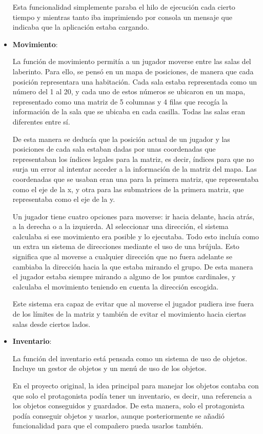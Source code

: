 \begin{itemize}
	Esta funcionalidad simplemente paraba el hilo de ejecución cada cierto tiempo y mientras tanto iba imprimiendo por consola un mensaje que indicaba que la aplicación estaba cargando.
	
	\item \textbf{Movimiento}:
	
	La función de movimiento permitía a un jugador moverse entre las salas del laberinto. Para ello, se pensó en un mapa de posiciones, de manera que cada posición representara una habitación.
	Cada sala estaba representada como un número del 1 al 20, y cada uno de estos números se ubicaron en un mapa, representado como una matriz de 5 columnas y 4 filas que recogía la información de la sala que se ubicaba en cada casilla. Todas las salas eran diferentes entre sí.
	
	De esta manera se deducía que la posición actual de un jugador y las posiciones de cada sala estaban dadas por unas coordenadas que representaban los índices legales para la matriz, es decir, índices para que no surja un error al intentar acceder a la información de la matriz del mapa. Las coordenadas que se usaban eran una para la primera matriz, que representaba como el eje de la x, y otra para las submatrices de la primera matriz, que representaba como el eje de la y.
	
	Un jugador tiene cuatro opciones para moverse: ir hacia delante, hacia atrás, a la derecha o a la izquierda. Al seleccionar una dirección, el sistema calculaba si ese movimiento era posible y lo ejecutaba.
	Todo esto incluía como un extra un sistema de direcciones mediante el uso de una brújula. Esto significa que al moverse a cualquier dirección que no fuera adelante se cambiaba la dirección hacia la que estaba mirando el grupo. De esta manera el jugador estaba siempre mirando a alguno de los puntos cardinales, y calculaba el movimiento teniendo en cuenta la dirección escogida.
	
	Este sistema era capaz de evitar que al moverse el jugador pudiera irse fuera de los límites de la matriz y también de evitar el movimiento hacia ciertas salas desde ciertos lados.
	
	\item \textbf{Inventario}:
	
	La función del inventario está pensada como un sistema de uso de objetos. Incluye un gestor de objetos y un menú de uso de los objetos.
	
	En el proyecto original, la idea principal para manejar los objetos contaba con que solo el protagonista podía tener un inventario, es decir, una referencia a los objetos conseguidos y guardados. De esta manera, solo el protagonista podía conseguir objetos y usarlos, aunque posteriormente se añadió funcionalidad para que el compañero pueda usarlos también.
	

\end{itemize}
